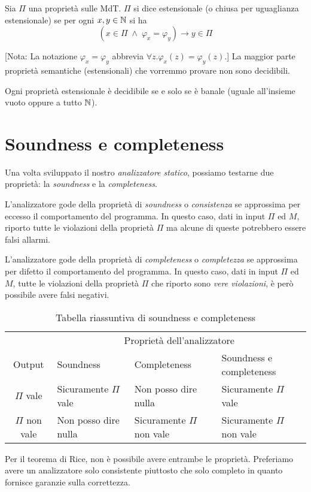 \begin{definition}
Sia $\Pi$ una proprietà sulle MdT. $\Pi$ si dice estensionale (o chiusa per uguaglianza estensionale) se per ogni $x,y\in\mathbb{N}$ si ha
\[ \left( x \in \Pi \; \land \; \varphi_x = \varphi_y \right) \to y \in \Pi \]
\end{definition}

[Nota: La notazione $\varphi_x = \varphi_y$ abbrevia $\forall z . \varphi_x(z)= \varphi_y(z)$.] La maggior parte proprietà semantiche (estensionali) che vorremmo provare non sono decidibili.

\begin{theorem}
Ogni proprietà estensionale è decidibile se e solo se è banale (uguale all'insieme vuoto oppure a tutto $\mathbb{N}$).
\end{theorem}

\section{Soundness e completeness}

Una volta sviluppato il nostro \emph{analizzatore statico}, possiamo testarne due proprietà: la \emph{soundness} e la \emph{completeness}. 

L'analizzatore gode della proprietà di \emph{soundness} o \emph{consistenza} se approssima per eccesso il comportamento del programma. In questo caso, dati in input $\Pi$ ed $M$, riporto tutte le violazioni della proprietà $\Pi$ ma alcune di queste potrebbero essere falsi allarmi.

L'analizzatore gode della proprietà di \emph{completeness} o \emph{completezza} se approssima per difetto il comportamento del programma.
In questo caso, dati in input $\Pi$ ed $M$, tutte le violazioni della proprietà $\Pi$ che riporto sono \emph{vere violazioni}, è però possibile avere falsi negativi. 

\begin{table}[htbp]
    \centering
    \begin{tabular}{c p{2.1cm} p{2.1cm} p{2.1cm} }
    \toprule
    & \multicolumn{3}{c}{{Proprietà dell'analizzatore}} \\[0.5em]\cmidrule{2-4}
    Output & Soundness & Completeness & Soundness e completeness \\\midrule
    $\Pi$ vale     & Sicuramente $\Pi$ vale & Non posso dire nulla & Sicuramente $\Pi$ vale \\
    $\Pi$ non vale & Non posso dire nulla   & Sicuramente $\Pi$ non vale & Sicuramente $\Pi$ non vale \\
    \bottomrule
    \end{tabular}
    \caption{Tabella riassuntiva di soundness e completeness}
\end{table}

Per il teorema di Rice, non è possibile avere entrambe le proprietà. Preferiamo avere un analizzatore solo consistente piuttosto che solo completo in quanto fornisce garanzie sulla correttezza.